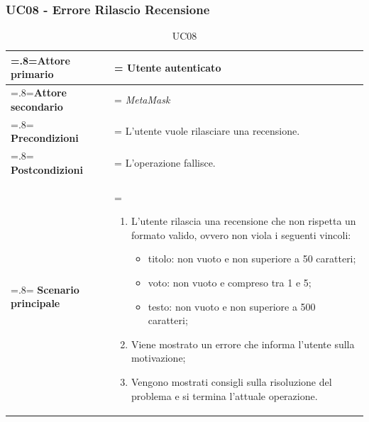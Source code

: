         \subsubsection{UC08 - Errore Rilascio Recensione}
        \label{UC08}

            \begin{table}[H]
                \centering
                \renewcommand{\arraystretch}{1.8}
                \renewcommand\tabularxcolumn[1]{m{#1}}
                \begin{tabularx}{0.9\textwidth} {
                    >{\hsize=.8\hsize\linewidth=\hsize}X
                    >{\hsize=1.2\hsize\linewidth=\hsize}X}
                    \hline
                    \textbf{Attore primario} & Utente autenticato \\
                    \hline
                    \textbf{Attore secondario} & \textit{MetaMask} \\
                    \hline
                    \textbf{Precondizioni} & L'utente vuole rilasciare una recensione. \\
                    \hline
                    \textbf{Postcondizioni} & L'operazione fallisce. \\
                    \hline
                    \textbf{Scenario principale} &
                        \begin{enumerate}
                            \item L'utente rilascia una recensione che non rispetta un formato valido, ovvero non viola i seguenti vincoli:
                            \begin{itemize}
                                \item titolo: non vuoto e non superiore a 50 caratteri;
                                \item voto: non vuoto e compreso tra 1 e 5;
                                \item testo: non vuoto e non superiore a 500 caratteri;
                            \end{itemize}
                            \item Viene mostrato un errore che informa l'utente sulla motivazione;
                            \item Vengono mostrati consigli sulla risoluzione del problema e si termina l'attuale operazione.
                        \end{enumerate} \\
                    \hline
                \end{tabularx}
                \caption{UC08}
            \end{table}

